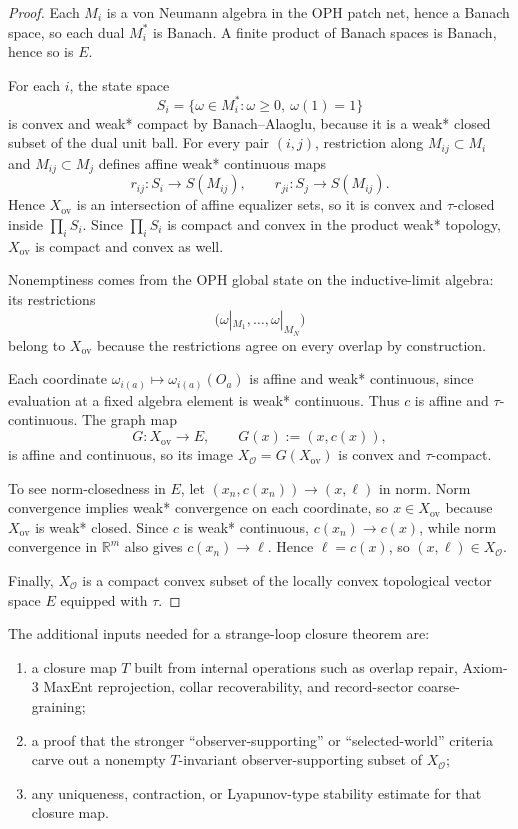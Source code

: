 \begin{proof}
Each \(M_i\) is a von Neumann algebra in the OPH patch net, hence a Banach space, so each dual
\(M_i^*\) is Banach. A finite product of Banach spaces is Banach, hence so is \(E\).

For each \(i\), the state space
\[
S_i=\{\omega\in M_i^*:\omega\ge 0,\ \omega(1)=1\}
\]
is convex and weak* compact by Banach--Alaoglu, because it is a weak* closed subset of the dual
unit ball. For every pair \((i,j)\), restriction along \(M_{ij}\subset M_i\) and
\(M_{ij}\subset M_j\) defines affine weak* continuous maps
\[
r_{ij}:S_i\to S(M_{ij}),
\qquad
r_{ji}:S_j\to S(M_{ij}).
\]
Hence \(X_{\mathrm{ov}}\) is an intersection of affine equalizer sets, so it is convex and
\(\tau\)-closed inside \(\prod_i S_i\). Since \(\prod_i S_i\) is compact and convex in the
product weak* topology, \(X_{\mathrm{ov}}\) is compact and convex as well.

Nonemptiness comes from the OPH global state on the inductive-limit algebra: its restrictions
\[
\bigl(\omega|_{M_1},\dots,\omega|_{M_N}\bigr)
\]
belong to \(X_{\mathrm{ov}}\) because the restrictions agree on every overlap by construction.

Each coordinate \(\omega_{i(a)}\mapsto \omega_{i(a)}(O_a)\) is affine and weak* continuous, since
evaluation at a fixed algebra element is weak* continuous. Thus \(c\) is affine and
\(\tau\)-continuous. The graph map
\[
G:X_{\mathrm{ov}}\to E,
\qquad
G(x):=(x,c(x)),
\]
is affine and continuous, so its image \(X_{\mathcal O}=G(X_{\mathrm{ov}})\) is convex and
\(\tau\)-compact.

To see norm-closedness in \(E\), let \((x_n,c(x_n))\to (x,\ell)\) in norm. Norm convergence
implies weak* convergence on each coordinate, so \(x\in X_{\mathrm{ov}}\) because
\(X_{\mathrm{ov}}\) is weak* closed. Since \(c\) is weak* continuous, \(c(x_n)\to c(x)\), while
norm convergence in \(\mathbb R^m\) also gives \(c(x_n)\to \ell\). Hence \(\ell=c(x)\), so
\((x,\ell)\in X_{\mathcal O}\).

Finally, \(X_{\mathcal O}\) is a compact convex subset of the locally convex topological vector
space \(E\) equipped with \(\tau\).
\end{proof}

The additional inputs needed for a strange-loop closure theorem are:
\begin{enumerate}
\item a closure map \(T\) built from internal operations such as overlap repair,
Axiom-3 MaxEnt reprojection, collar recoverability, and record-sector coarse-graining;
\item a proof that the stronger ``observer-supporting'' or ``selected-world'' criteria carve out a
nonempty \(T\)-invariant observer-supporting subset of \(X_{\mathcal O}\);
\item any uniqueness, contraction, or Lyapunov-type stability estimate for that closure map.
\end{enumerate}

